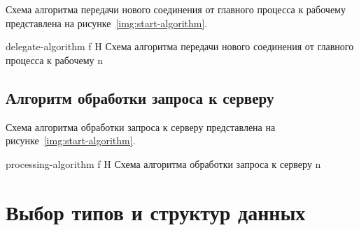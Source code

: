 Схема алгоритма передачи нового соединения от главного процесса к рабочему представлена на рисунке~\ref{img:start-algorithm}.

{delegate-algorithm}
{f} %
{H}
{\textwidth} %
{Схема алгоритма передачи нового соединения от главного процесса к рабочему}
{n}

\subsection{Алгоритм обработки запроса к серверу}

Схема алгоритма обработки запроса к серверу представлена на рисунке~\ref{img:start-algorithm}.

{processing-algorithm}
{f} %
{H}
{\textwidth} %
{Схема алгоритма обработки запроса к серверу}
{n}

\section{Выбор типов и структур данных}

